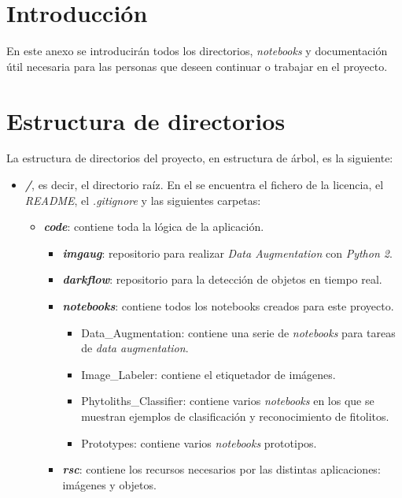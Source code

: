 
\section{Introducción}
En este anexo se introducirán todos los directorios, \textit{notebooks} y documentación útil necesaria para las personas que deseen continuar o trabajar en el proyecto.

\section{Estructura de directorios}
La estructura de directorios del proyecto, en estructura de árbol, es la siguiente:

\begin{itemize}
	\item \textit{\textbf{/}}, es decir, el directorio raíz. En el se encuentra el fichero de la licencia, el \textit{README}, el \textit{.gitignore} y las siguientes carpetas:
	\begin{itemize}
		\item \textit{\textbf{code}}: contiene toda la lógica de la aplicación.
			\begin{itemize}
				\item \textit{\textbf{imgaug}}: repositorio para realizar \textit{Data Augmentation} con \textit{Python 2}.
				\item \textit{\textbf{darkflow}}: repositorio para la detección de objetos en tiempo real.
				\item \textit{\textbf{notebooks}}: contiene todos los notebooks creados para este proyecto.
				\begin{itemize}
					\item Data\_Augmentation: contiene una serie de \textit{notebooks} para tareas de \textit{data augmentation}.
					\item Image\_Labeler: contiene el etiquetador de imágenes.
					\item Phytoliths\_Classifier: contiene varios \textit{notebooks} en los que se muestran ejemplos de clasificación y reconocimiento de fitolitos.
					\item Prototypes: contiene varios \textit{notebooks} prototipos.
				\end{itemize}
				\item \textit{\textbf{rsc}}: contiene los recursos necesarios por las distintas aplicaciones: imágenes y objetos. 
			\end{itemize}

\end{itemize}
\end{itemize}
